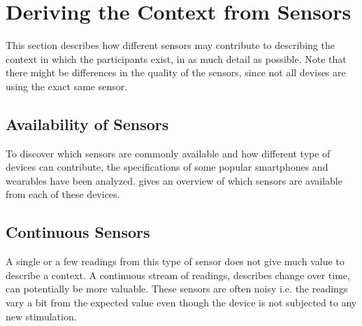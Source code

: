 
\section{Deriving the Context from Sensors}
\label{sec:deriving_the_context_from_sensors}
This section describes how different sensors may contribute to describing the context in which the participants exist, in as much detail as possible. Note that there might be differences in the quality of the sensors, since not all devises are using the exact same sensor.

\subsection{Availability of Sensors}
To discover which sensors are commonly available and how different type of devices can contribute, the specifications of some popular smartphones and wearables have been analyzed.  gives an overview of which sensors are available from each of these devices. 



\subsection{Continuous Sensors}
A single or a few readings from this type of sensor does not give much value to describe a context. A continuous stream of readings, describes change over time, can potentially be more valuable. These sensors are often noisy i.e. the readings vary a bit from the expected value even though the device is not subjected to any new stimulation.

